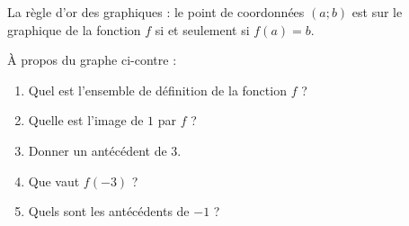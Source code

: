 \begin{Aprojeter}

    \begin{Aretenir}
        La règle d'or des graphiques : le point de coordonnées \( (a;b)\) est sur le graphique de la fonction \( f\) si et seulement si \( f(a)=b\).
    \end{Aretenir}



    \begin{multicols}{2}

    À propos du graphe ci-contre :
    \begin{enumerate}
        \item
            Quel est l'ensemble de définition de la fonction \( f\) ?
        \item
            Quelle est l'image de \( 1\) par \( f\) ?
        \item
            Donner un antécédent de \( 3\).
        \item
            Que vaut \( f(-3)\) ?
        \item
            Quels sont les antécédents de \( -1\) ?
    \end{enumerate}
        
        \columnbreak

    \begin{center}
       
    \end{center}

    \end{multicols}
\end{Aprojeter}



